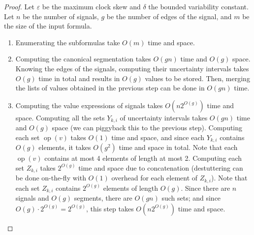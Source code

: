\begin{proof}
	Let $\varepsilon$ be the maximum clock skew and $\delta$ the bounded variability constant.
	Let $n$ be the number of signals, $g$ be the number of edges of the signal, and $m$ be the size of the input formula.
		
	\begin{enumerate}
		\item 
		Enumerating the subformulas take $O(m)$ time and space.
		
		\item 
		Computing the canonical segmentation takes $O(gn)$ time and $O(g)$ space. %
		Knowing the edges of the signals, computing their uncertainty intervals takes $O(g)$ time in total and results in $O(g)$ values to be stored.
		Then, merging the lists of values obtained in the previous step can be done in $O(gn)$ time.
		
		\item
		Computing the value expressions of signals takes $O(n 2^{O(g)})$ time and space.
		Computing all the sets $Y_{k,i}$ of uncertainty intervals takes $O(gn)$ time and $O(g)$ space (we can piggyback this to the previous step).
		Computing each set $\operatorname{op}(v)$ takes $O(1)$ time and space, and since each $Y_{k,i}$ contains $O(g)$ elements, it takes $O(g^2)$ time and space in total.
		Note that each $\operatorname{op}(v)$ contains at most 4 elements of length at most 2.
		Computing each set $Z_{k,i}$ takes $2^{O(g)}$ time and space due to concatenation (destuttering can be done on-the-fly with $O(1)$ overhead for each element of $Z_{k,i}$).
		Note that each set $Z_{k,i}$ contains $2^{O(g)}$ elements of length $O(g)$.
		Since there are $n$ signals and $O(g)$ segments, there are $O(gn)$ such sets; and since $O(g) \cdot 2^{O(g)} = 2^{O(g)}$, this step takes $O(n 2^{O(g)})$ time and space.
		
		

\end{enumerate}
\end{proof}
